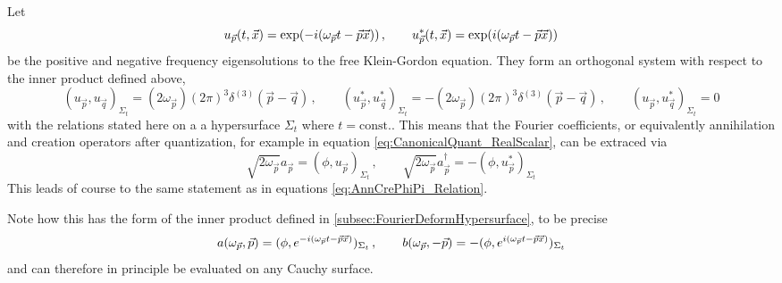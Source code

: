 Let 
\begin{equation}
    u_{\vec{p}}(t,\vec{x})=\exp(-{i}(\omega_{\vec{p}}t-\vec{p}\vec{x}))\,,\qquad u_{\vec{p}}^*(t,\vec{x})=\exp({i}(\omega_{\vec{p}}t-\vec{p}\vec{x}))
\end{equation}
be the positive and negative frequency eigensolutions to the free Klein-Gordon equation. They form an orthogonal system with respect to the inner product defined above,
\begin{equation}
    (u_{\vec{p}},u_{\vec{q}})_{\Sigma_t}=(2\omega_{\vec{p}})(2\pi)^3\delta^{(3)}(\vec{p}-\vec{q})\,,\qquad (u_{\vec{p}}^*,u_{\vec{q}}^*)_{\Sigma_t}=-(2\omega_{\vec{p}})(2\pi)^3\delta^{(3)}(\vec{p}-\vec{q})\,,\qquad (u_{\vec{p}},u_{\vec{q}}^*)_{\Sigma_t}=0
\end{equation}
with the relations stated here on a a hypersurface $\Sigma_t$ where $t=\text{const.}$. This means that the Fourier coefficients, or equivalently annihilation and creation operators after quantization, for example in equation \eqref{eq:CanonicalQuant_RealScalar}, can be extraced via
\begin{equation}
    \sqrt{2\omega_{\vec{p}}}a_{\vec{p}}=(\phi,u_{\vec{p}})_{\Sigma_t}\,,\qquad \sqrt{2\omega_{\vec{p}}}a_{\vec{p}}^\dagger=-(\phi,u_{\vec{p}}^*)_{\Sigma_t}
\end{equation}
This leads of course to the same statement as in equations \eqref{eq:AnnCrePhiPi_Relation}.

Note how this has the form of the inner product defined in \ref{subsec:FourierDeformHypersurface}, to be precise
\begin{equation}
    a(\omega_{\vec{p}},\vec{p})=(\phi,e^{-{i}(\omega_{\vec{p}}t-\vec{p}\vec{x})})_{\Sigma_t}\,,\qquad b(\omega_{\vec{p}},-\vec{p})=-(\phi,e^{{i}(\omega_{\vec{p}}t-\vec{p}\vec{x})})_{\Sigma_t}
\end{equation}
and can therefore in principle be evaluated on any Cauchy surface.

